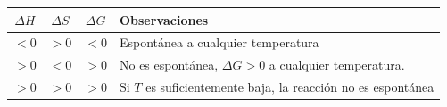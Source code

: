 \begin{table}[H]
    \centering
    \begin{tabular}{@{}cccl@{}}
        \toprule
        \textbf{\(\Delta H\)} & \textbf{\(\displaystyle \Delta S\)} & \textbf{\(\displaystyle \Delta G\)} & \textbf{Observaciones} \\
        \midrule
        \(< 0\) & \(\displaystyle > 0\) & \(\displaystyle < 0\) & Espontánea a cualquier temperatura \\[3pt]
        \(> 0\) & \(\displaystyle < 0\) & \(\displaystyle > 0\) & No es espontánea, \(\Delta G > 0\) a cualquier temperatura. \\[3pt]
        \(> 0\) & \(\displaystyle > 0\) & \(\displaystyle > 0\) & Si \( T \) es suficientemente baja, la reacción no es espontánea \\[3pt]

\end{tabular}
\end{table}
